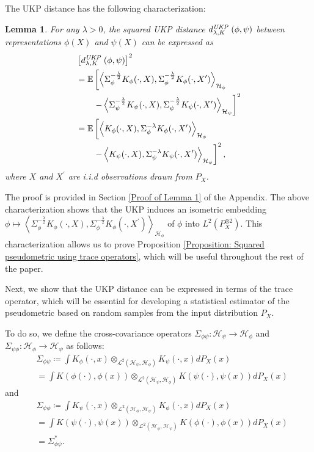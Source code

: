 \documentclass{article}
\theoremstyle{plain}
\newcounter{lemmano}
\newtheorem{lemma}[lemmano]{Lemma}
\newcommand{\E}{\mathbb{E}}
\newcommand{\HS}{\mathcal{L}^{2}}
\newcommand{\repone}{\phi}
\newcommand{\reptwo}{\psi}
\newcommand{\Hone}{\mathcal{H}_{\phi}}
\newcommand{\Htwo}{\mathcal{H}_{\psi}}
\newcommand{\inprod}[1]{\left \langle #1 \right\rangle}
\newcommand{\metricstname}{UKP }
\begin{document}
The \metricstname distance has the following characterization:
\begin{lemma}\label{Characterization of pseudometric in terms of expected squared distance}
For any $\lambda>0$, the squared \metricstname distance $d_{\lambda,K}^{\emph{\metricstname}}(\repone,\reptwo)$ between representations $\repone(X)$ and $\reptwo(X)$ can be expressed as
\[
\begin{aligned}
    & \left[d_{\lambda,K}^{\emph{\metricstname}}(\repone,\reptwo)\right]^{2}\\
    &= \E  \left[\inprod{\Sigma_{\repone}^{-\frac{\lambda}{2}}K_{\repone}(\cdot,X),\Sigma_{\repone}^{-\frac{\lambda}{2}}K_{\repone}(\cdot,X^{\prime})}_{\Hone} \right. \\
    & \qquad\left.-\inprod{\Sigma_{\reptwo}^{-\frac{\lambda}{2}}K_{\reptwo}(\cdot,X),\Sigma_{\reptwo}^{-\frac{\lambda}{2}}K_{\reptwo}(\cdot,X^{\prime})}_{\Htwo}\right]^{2}\\
    & = \E  \left[\inprod{K_{\repone}(\cdot,X),\Sigma_{\repone}^{-\lambda}K_{\repone}(\cdot,X^{\prime})}_{\Hone} \right. \\
    & \qquad\left.-\inprod{K_{\reptwo}(\cdot,X),\Sigma_{\reptwo}^{-\lambda}K_{\reptwo}(\cdot,X^{\prime})}_{\Htwo}\right]^{2},
\end{aligned}
\]
where $X$ and $X^{\prime}$ are i.i.d observations drawn from $P_{X}$.
\end{lemma}

The proof is provided in Section \ref{Proof of Lemma 1} of the Appendix. The above characterization shows that the \metricstname induces an isometric embedding $\repone \mapsto \inprod{\Sigma_{\repone}^{-\frac{\lambda}{2}}K_{\repone}(\cdot,X),\Sigma_{\repone}^{-\frac{\lambda}{2}}K_{\repone}(\cdot,X^{\prime})}_{\Hone}$ of $\repone$ into $L^{2}(P_{X}^{\otimes 2})$. This characterization allows us to prove Proposition \ref{Proposition: Squared pseudometric using trace operators}, which will be useful throughout the rest of the paper.

Next, we show that the \metricstname distance can be expressed in terms of the trace operator, which will be essential for developing a statistical estimator of the pseudometric based on random samples from the input distribution $P_{X}$. 

To do so, we define the cross-covariance operators $\Sigma_{\repone\reptwo}: \Htwo \to \Hone$ and $\Sigma_{\reptwo\repone}: \Hone \to \Htwo$ as follows:
\[
\begin{aligned}
    &\Sigma_{\repone\reptwo} \coloneq\int K_{\repone}(\cdot,x) \otimes_{\HS(\Htwo,\Hone)}  K_{\reptwo}(\cdot,x) dP_{X}(x)\\ &= \int K(\repone(\cdot),\repone(x)) \otimes_{\HS(\Htwo,\Hone)}  K(\reptwo(\cdot),\reptwo(x)) dP_{X}(x)
\end{aligned}
\]and
\[
\begin{aligned}
    &\Sigma_{\reptwo\repone} \coloneq \int K_{\reptwo}(\cdot,x) \otimes_{\HS(\Hone,\Htwo)} K_{\repone}(\cdot,x) dP_{X}(x)\\
    &= \int  K(\reptwo(\cdot),\reptwo(x))\otimes_{\HS(\Hone,\Htwo)}  K(\repone(\cdot),\repone(x))dP_{X}(x)\\
    &= \Sigma_{\repone\reptwo}^{*}.
\end{aligned}
\]
\end{document}
